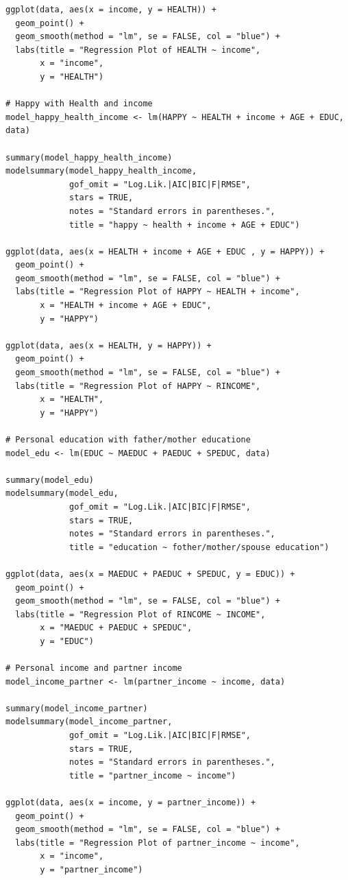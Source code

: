 \documentclass{article}[13pt]
\begin{document}
\begin{verbatim}
ggplot(data, aes(x = income, y = HEALTH)) +
  geom_point() +
  geom_smooth(method = "lm", se = FALSE, col = "blue") +
  labs(title = "Regression Plot of HEALTH ~ income",
       x = "income",
       y = "HEALTH")

# Happy with Health and income
model_happy_health_income <- lm(HAPPY ~ HEALTH + income + AGE + EDUC, data)

summary(model_happy_health_income)
modelsummary(model_happy_health_income,
             gof_omit = "Log.Lik.|AIC|BIC|F|RMSE",
             stars = TRUE,
             notes = "Standard errors in parentheses.",
             title = "happy ~ health + income + AGE + EDUC")

ggplot(data, aes(x = HEALTH + income + AGE + EDUC , y = HAPPY)) +
  geom_point() +
  geom_smooth(method = "lm", se = FALSE, col = "blue") +
  labs(title = "Regression Plot of HAPPY ~ HEALTH + income",
       x = "HEALTH + income + AGE + EDUC",
       y = "HAPPY")

ggplot(data, aes(x = HEALTH, y = HAPPY)) +
  geom_point() +
  geom_smooth(method = "lm", se = FALSE, col = "blue") +
  labs(title = "Regression Plot of HAPPY ~ RINCOME",
       x = "HEALTH",
       y = "HAPPY")

# Personal education with father/mother educatione
model_edu <- lm(EDUC ~ MAEDUC + PAEDUC + SPEDUC, data)

summary(model_edu)
modelsummary(model_edu,
             gof_omit = "Log.Lik.|AIC|BIC|F|RMSE",
             stars = TRUE,
             notes = "Standard errors in parentheses.",
             title = "education ~ fother/mother/spouse education")

ggplot(data, aes(x = MAEDUC + PAEDUC + SPEDUC, y = EDUC)) +
  geom_point() +
  geom_smooth(method = "lm", se = FALSE, col = "blue") +
  labs(title = "Regression Plot of RINCOME ~ INCOME",
       x = "MAEDUC + PAEDUC + SPEDUC",
       y = "EDUC")

# Personal income and partner income
model_income_partner <- lm(partner_income ~ income, data)

summary(model_income_partner)
modelsummary(model_income_partner,
             gof_omit = "Log.Lik.|AIC|BIC|F|RMSE",
             stars = TRUE,
             notes = "Standard errors in parentheses.",
             title = "partner_income ~ income")

ggplot(data, aes(x = income, y = partner_income)) +
  geom_point() +
  geom_smooth(method = "lm", se = FALSE, col = "blue") +
  labs(title = "Regression Plot of partner_income ~ income",
       x = "income",
       y = "partner_income")


\end{verbatim}
\end{document}
